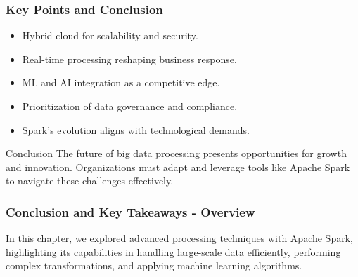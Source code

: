 \documentclass[aspectratio=169]{beamer}
\begin{document}
\begin{frame}[fragile]
  \frametitle{Key Points and Conclusion}
  \begin{itemize}
    \item Hybrid cloud for scalability and security.
    \item Real-time processing reshaping business response.
    \item ML and AI integration as a competitive edge.
    \item Prioritization of data governance and compliance.
    \item Spark's evolution aligns with technological demands.
  \end{itemize}
  \begin{block}{Conclusion}
    The future of big data processing presents opportunities for growth and innovation. Organizations must adapt and leverage tools like Apache Spark to navigate these challenges effectively.
  \end{block}
\end{frame}

\begin{frame}[fragile]
    \frametitle{Conclusion and Key Takeaways - Overview}
    In this chapter, we explored advanced processing techniques with Apache Spark, highlighting its capabilities in handling large-scale data efficiently, performing complex transformations, and applying machine learning algorithms.
\end{frame}
\end{document}
